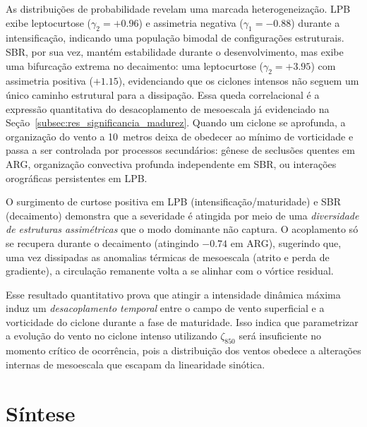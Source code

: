As distribuições de probabilidade revelam uma marcada heterogeneização.
LPB exibe leptocurtose ($\gamma_2 = +0.96$) e assimetria negativa ($\gamma_1 = -0.88$) durante a intensificação, indicando uma população bimodal de configurações estruturais.
SBR, por sua vez, mantém estabilidade durante o desenvolvimento, mas exibe uma bifurcação extrema no decaimento: uma leptocurtose ($\gamma_2 = +3.95$) com assimetria positiva ($+1.15$), evidenciando que os ciclones intensos não seguem um único caminho estrutural para a dissipação.
Essa queda correlacional é a expressão quantitativa do desacoplamento de mesoescala já evidenciado na Seção~\ref{subsec:res_significancia_madurez}.
Quando um ciclone se aprofunda, a organização do vento a 10~metros deixa de obedecer ao mínimo de vorticidade e passa a ser controlada por processos secundários: gênese de seclusões quentes em ARG, organização convectiva profunda independente em SBR, ou interações orográficas persistentes em LPB.

O surgimento de curtose positiva em LPB (intensificação/maturidade) e SBR (decaimento) demonstra que a severidade é atingida por meio de uma \textit{diversidade de estruturas assimétricas} que o modo dominante não captura.
O acoplamento só se recupera durante o decaimento (atingindo $-0.74$ em ARG), sugerindo que, uma vez dissipadas as anomalias térmicas de mesoescala (atrito e perda de gradiente), a circulação remanente volta a se alinhar com o vórtice residual.



Esse resultado quantitativo prova que atingir a intensidade dinâmica máxima induz um \textit{desacoplamento temporal} entre o campo de vento superficial e a vorticidade do ciclone durante a fase de maturidade.
Isso indica que parametrizar a evolução do vento no ciclone intenso utilizando $\zeta_{850}$ será insuficiente no momento crítico de ocorrência, pois a distribuição dos ventos obedece a alterações internas de mesoescala que escapam da linearidade sinótica.

\section{Síntese}\label{sec:sintesis_wind10}

